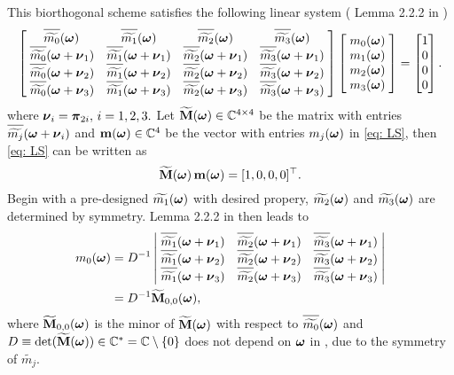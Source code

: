 This biorthogonal scheme satisfies the following linear system (
Lemma 2.2.2 in \cite{cohen1993compactly} )
\begin{align}\label{eq: LS}
\begin{bmatrix}
    \, \sbarm{0} &  \sbarm{1} &  \sbarm{2} & \sbarm{3}\; \\
    \;\sbarmn{0}{1} & \sbarmn{1}{1}  & \sbarmn{2}{1}  & \sbarmn{3}{1}\; \\
    \;\sbarmn{0}{2} & \sbarmn{1}{2}  & \sbarmn{2}{2}  & \sbarmn{3}{2}\; \\
    \;\sbarmn{0}{3} & \sbarmn{1}{3} & \sbarmn{2}{3} & \sbarmn{3}{3}\;
\end{bmatrix}
\begin{bmatrix}
\;\mo{0}\; \\
\;\mo{1}\; \\
\;\mo{2}\; \\
\;\mo{3}\; 
\end{bmatrix} 
=
\begin{bmatrix}
1\\
0\\
0\\
0
\end{bmatrix}.
\end{align}
 where $\boldsymbol{\nu}_i = \boldsymbol{\pi}_{2i},\, i = 1,2,3.$ %
 Let $\widetilde{\mathbf{M}}(\boldsymbol{\omega})\in\mathbb{C}^{4\times 4}$ be the matrix with entries $\sbarmn{j}{i}$ and $\mathbf{m}(\boldsymbol{\omega})\in\mathbb{C}^4$ be the vector with entries $m_j(\boldsymbol{\omega})$ in \eqref{eq: LS}, then \eqref{eq: LS} can be written as \[\widetilde{\mathbf{M}}(\boldsymbol{\omega})\, \mathbf{m} (\boldsymbol{\omega})= [1,0,0,0]^\top.\]
Begin with a pre-designed $\widetilde{m_{1}}(\boldsymbol{\omega})$ with desired propery, $\widetilde{m_{2}}(\boldsymbol{\omega})$ and $\widetilde{m_{3}}(\boldsymbol{\omega})$ are determined by symmetry. Lemma 2.2.2 in \cite{cohen1993compactly} then leads to
\begin{align}\label{eq: m0-sol}
m_0(\V{\omega}) &= D^{-1}%
\left|
\begin{matrix}
    \; \sbarmn{1}{1}  & \sbarmn{2}{1}  & \sbarmn{3}{1}\; \\
    \; \sbarmn{1}{2}  & \sbarmn{2}{2}  & \sbarmn{3}{2}\; \\
    \; \sbarmn{1}{3} & \sbarmn{2}{3} & \sbarmn{3}{3}\;
\end{matrix}
\right| \notag\\
&= D^{-1}\widetilde{\mathbf{M}}_{0,0}(\V{\omega}),
\end{align}
where $\widetilde{\mathbf{M}}_{0,0}(\boldsymbol{\omega})$ is the minor of $\widetilde{\mathbf{M}}(\boldsymbol{\omega})$ with respect to $\sbarm{0}$ and $ D \equiv \det(\widetilde{\mathbf{M}}(\boldsymbol{\omega}))\in \mathbb{C}^* = \mathbb{C}\setminus\{0\}$ does not depend on $\boldsymbol{\omega}$ in \cite{cohen1993compactly}, due to the symmetry of $\widetilde{m_j}$.

